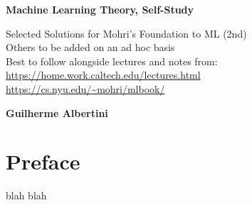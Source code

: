 \documentclass[titlepage]{book}
\begin{document}
\begin{titlepage}
    \begin{center}
        \vspace*{1cm}
            
        \Huge
        \textbf{Machine Learning Theory, Self-Study}
            
        \vspace{0.5cm}
        \LARGE
        Selected Solutions for Mohri's Foundation to ML (2nd)\\
		Others to be added on an ad hoc basis\\
        Best to follow alongside lectures and notes from:\\
        \url{https://home.work.caltech.edu/lectures.html}\\
        \url{https://cs.nyu.edu/~mohri/mlbook/}\\
        \vspace{1.5cm}
            
        \textbf{Guilherme Albertini}
            
        \vfill
            
            
        \vspace{0.8cm}
            

        \Large
        
            
    \end{center}
\end{titlepage}

\frontmatter
\tableofcontents

\chapter*{Preface}

\TODO blah blah

\mainmatter



\end{document}
